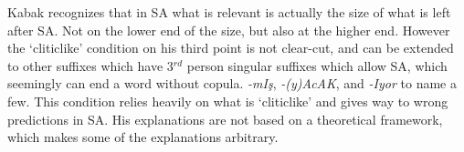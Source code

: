 Kabak recognizes that in SA what is relevant is actually the size of what is left after SA. Not on the lower end of the size, but also at the higher end. However the `cliticlike' condition on his third point is not clear-cut, and can be extended to other suffixes which have 3$^{rd}$ person singular suffixes which allow SA, which seemingly can end a word without copula. \textit{-mIş}, \textit{-(y)AcAK}, and \textit{-Iyor} to name a few. This condition relies heavily on what is `cliticlike' and gives way to wrong predictions in SA. His explanations are not based on a theoretical framework, which makes some of the explanations arbitrary. 